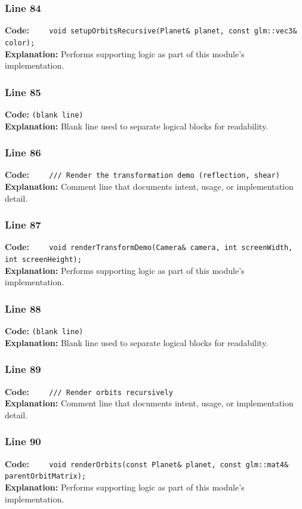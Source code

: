 \documentclass[11pt,a4paper]{article}
\begin{document}
\subsubsection*{Line 84}
\textbf{Code:} \verb|    void setupOrbitsRecursive(Planet& planet, const glm::vec3& color);|\\
\textbf{Explanation:} Performs supporting logic as part of this module's implementation.

\subsubsection*{Line 85}
\textbf{Code:} \texttt{(blank line)}\\
\textbf{Explanation:} Blank line used to separate logical blocks for readability.

\subsubsection*{Line 86}
\textbf{Code:} \verb|    /// Render the transformation demo (reflection, shear)|\\
\textbf{Explanation:} Comment line that documents intent, usage, or implementation detail.

\subsubsection*{Line 87}
\textbf{Code:} \verb|    void renderTransformDemo(Camera& camera, int screenWidth, int screenHeight);|\\
\textbf{Explanation:} Performs supporting logic as part of this module's implementation.

\subsubsection*{Line 88}
\textbf{Code:} \texttt{(blank line)}\\
\textbf{Explanation:} Blank line used to separate logical blocks for readability.

\subsubsection*{Line 89}
\textbf{Code:} \verb|    /// Render orbits recursively|\\
\textbf{Explanation:} Comment line that documents intent, usage, or implementation detail.

\subsubsection*{Line 90}
\textbf{Code:} \verb|    void renderOrbits(const Planet& planet, const glm::mat4& parentOrbitMatrix);|\\
\textbf{Explanation:} Performs supporting logic as part of this module's implementation.
\end{document}
